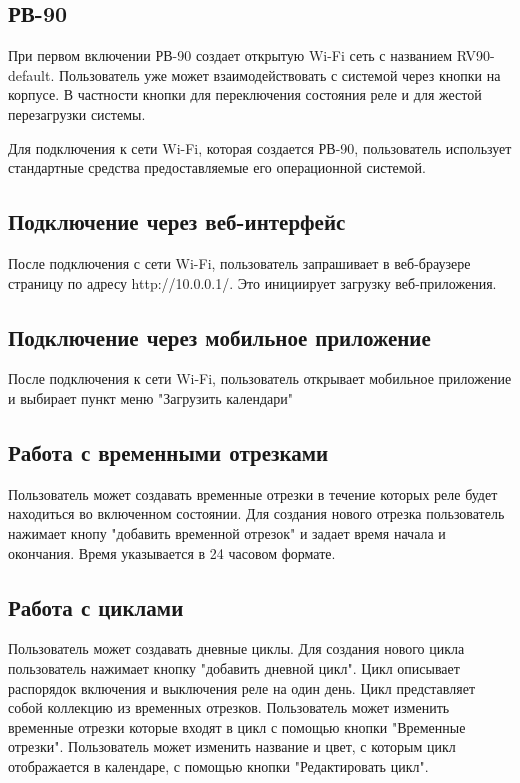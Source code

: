 \subsection{РВ-90}
При первом включении РВ-90 создает открытую Wi-Fi сеть  с названием RV90-default.
Пользователь уже может взаимодействовать с системой через кнопки на корпусе. В частности кнопки для переключения состояния реле и для жестой перезагрузки системы.
 
Для подключения к сети Wi-Fi, которая создается РВ-90, пользователь использует стандартные средства предоставляемые его операционной системой.

\subsection{Подключение через веб-интерфейс}
После подключения с сети Wi-Fi, пользователь запрашивает в веб-браузере страницу по адресу http://10.0.0.1/. Это инициирует загрузку веб-приложения.

\subsection{Подключение через мобильное приложение}
После подключения к сети Wi-Fi, пользователь открывает мобильное приложение и выбирает пункт меню "Загрузить календари"

\subsection{Работа с временными отрезками}
Пользователь может создавать временные отрезки в течение которых реле будет находиться во включенном состоянии. Для создания нового отрезка пользователь нажимает кнопу "добавить временной отрезок" и задает время начала и окончания. Время указывается в 24 часовом формате. 


\subsection{Работа с циклами}
Пользователь может создавать дневные циклы. Для создания нового цикла пользователь нажимает кнопку "добавить дневной цикл". Цикл описывает распорядок включения и выключения реле на один день. Цикл представляет собой коллекцию из временных отрезков. Пользователь может изменить временные отрезки которые входят в цикл с помощью кнопки "Временные отрезки". Пользователь может изменить название и цвет, с которым цикл отображается в календаре, с помощью кнопки "Редактировать цикл".


